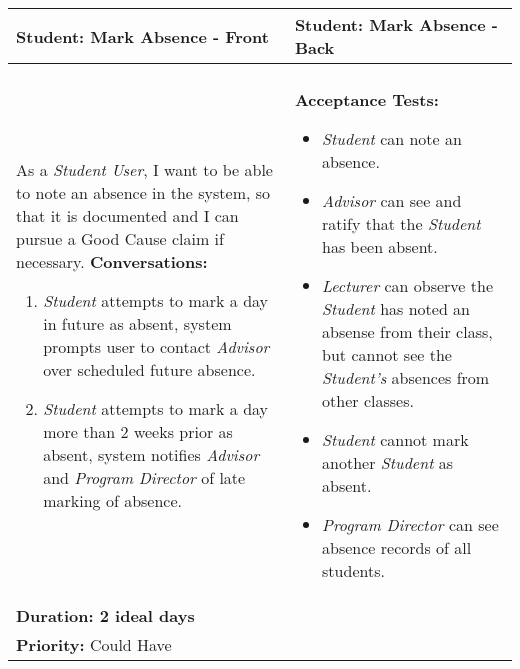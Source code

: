 \documentclass[11pt]{article}
\begin{document}
\begin{center}
\begin{tabular}{ | m{8cm}  |  m{8cm}  | } 
 \hline
 \textbf{Student: Mark Absence - Front} &  \textbf{Student: Mark Absence - Back}  \\ 
  \hline
&\\[5pt]
As a \emph{Student User}, I want to be able to note an absence in the system, so that it is documented and I can pursue a Good Cause claim if necessary.  
\newline
\textbf{Conversations:}
\begin{enumerate}
\item{\emph{Student} attempts to mark a day in future as absent, system prompts user to contact \emph{Advisor} over scheduled future absence.}
\item{\emph{Student} attempts to mark a day more than 2 weeks prior as absent, system notifies \emph{Advisor} and \emph{Program Director} of late marking of absence.}
\end{enumerate}
& \textbf{Acceptance Tests:} 
\begin{itemize}
\item{\emph{Student} can note an absence.}
\item{\emph{Advisor} can see and ratify that the \emph{Student} has been absent.}
\item{\emph{Lecturer} can observe the \emph{Student} has noted an absense from their class, but cannot see the \emph{Student's} absences from other classes.}
\item{\emph{Student} cannot mark another \emph{Student} as absent.} 
\item{\emph{Program Director} can see absence records of all students.}
\end{itemize} \\
\textbf{Duration: 2 ideal days} &\\
\textbf{Priority:}  \textcolor{dkgreen}{Could Have} & \\
 \hline
\end{tabular}
\end{center}
\end{document}
